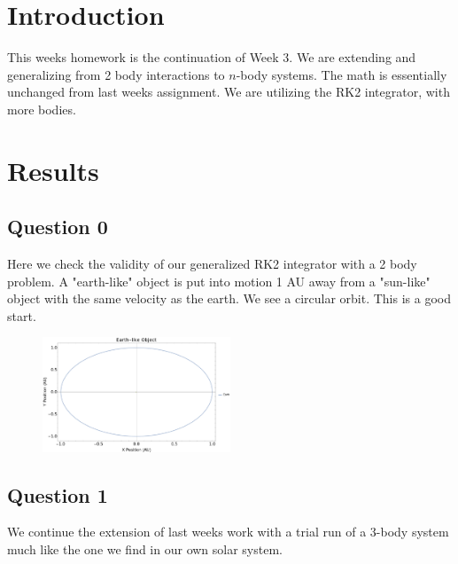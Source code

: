 \documentclass{article}
\author{\hwauthor}
\title{\hwtitle}
\date{\hwdate}
\begin{document}
\maketitle
\thispagestyle{fancy}

\section{Introduction}
 
This weeks homework is the continuation of Week 3. We are extending and generalizing from 2 body interactions to $n$-body systems. The math is essentially unchanged from last weeks assignment. We are utilizing the RK2 integrator, with more bodies.

\section{Results}

\subsection{Question 0}

Here we check the validity of our generalized RK2 integrator with a 2 body problem. A "earth-like" object is put into motion 1 AU away from a "sun-like" object with the same velocity as the earth. We see a circular orbit. This is a good start.

\begin{figure}[!htb]
	\begin{center}
		\includegraphics[width=0.5\textwidth]{p0.pdf}
	\end{center}
	\caption{}
\label{fig:qual}
\end{figure}
\FloatBarrier

\subsection{Question 1}

We continue the extension of last weeks work with a trial run of a 3-body system much like the one we find in our own solar system.
\end{document}
